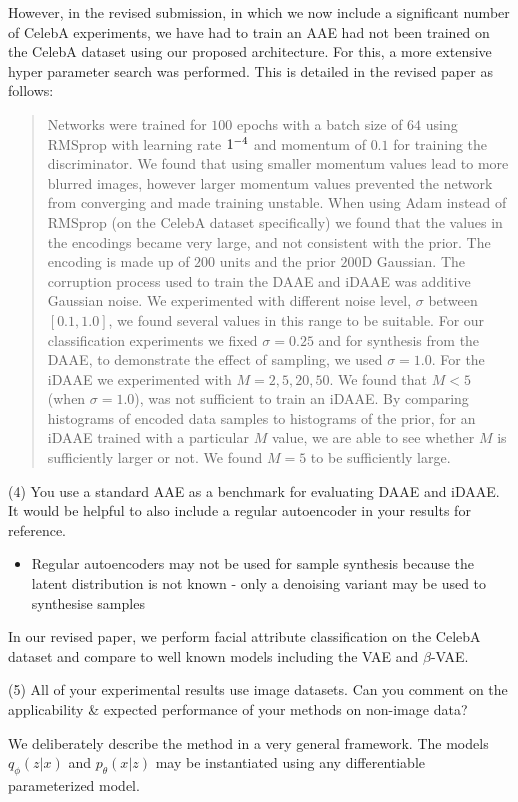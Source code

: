 \documentclass{article}
\begin{document}
{However, in the revised submission, in which we now include a significant number of CelebA experiments, we have had to train an AAE had not been trained on the CelebA dataset using our proposed architecture. For this, a more extensive hyper parameter search was performed. This is detailed in the revised paper as follows:

\begin{quote}
Networks were trained for $100$ epochs with a batch size of $64$ using RMSprop with learning rate $1 \time 10^{-4}$ and momentum of $0.1$ for training the discriminator. We found that using smaller momentum values lead to more blurred images, however larger momentum values prevented the network from converging and made training unstable. When using Adam instead of RMSprop (on the CelebA dataset specifically) we found that the values in the encodings became very large, and not consistent with the prior. The encoding is made up of $200$ units and the prior $200$D Gaussian. The corruption process used to train the DAAE and iDAAE was additive Gaussian noise. We experimented with different noise level, $\sigma$ between $[0.1, 1.0]$, we found several values in this range to be suitable. For our classification experiments we fixed $\sigma=0.25$ and for synthesis from the DAAE, to demonstrate the effect of sampling, we used $\sigma=1.0$. For the iDAAE we experimented with $M=2, 5, 20, 50$. We found that $M < 5$ (when $\sigma=1.0$), was not sufficient to train an iDAAE. By comparing histograms of encoded data samples to histograms of the prior, for an iDAAE trained with a particular $M$ value, we are able to see whether $M$ is sufficiently larger or not. We found $M=5$ to be sufficiently large.
\end{quote}


{\color{blue}
(4) You use a standard AAE as a benchmark for evaluating DAAE and iDAAE. It would be helpful to also include a regular autoencoder in your results for reference.}\newline

\begin{itemize}
    \item Regular autoencoders may not be used for sample synthesis because the latent distribution is not known - only a denoising variant may be used to synthesise samples
\end{itemize}
In our revised paper, we perform facial attribute classification on the CelebA dataset and compare to well known models including the VAE and $\beta$-VAE.

{\color{blue}
(5) All of your experimental results use image datasets. Can you comment on the applicability \& expected performance of your methods on non-image data?}\newline

We deliberately describe the method in a very general framework. The models $q_\phi(z|x)$ and $p_\theta(x|z)$ may be instantiated using any differentiable parameterized model.}
\end{document}
